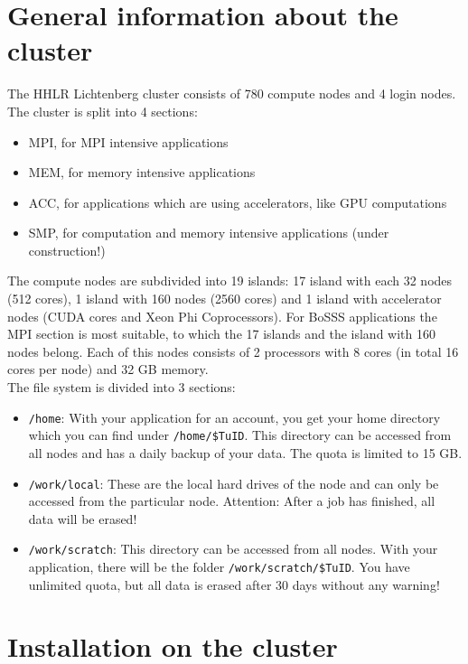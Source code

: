 \documentclass[11pt,twoside,a4paper]{fdyartcl}
\begin{document}
\section{General information about the cluster}
\label{sec:information}

The HHLR Lichtenberg cluster consists of 780 compute nodes and 4 login nodes. The cluster is split into 4 sections: 
\begin{itemize}
	\item MPI, for MPI intensive applications
	\item MEM, for memory intensive applications
	\item ACC, for applications which are using accelerators, like GPU computations
	\item SMP, for computation and memory intensive applications (under construction!)
\end{itemize}
The compute nodes are subdivided into 19 islands: 17 island with each 32 nodes (512 cores), 1 island with 160 nodes (2560 cores) and 1 island with accelerator nodes (CUDA cores and Xeon Phi Coprocessors). For BoSSS applications the MPI section is most suitable, to which the 17 islands and the island with 160 nodes belong. Each of this nodes consists of 2 processors with 8 cores (in total 16 cores per node) and 32 GB memory.\\
The file system is divided into 3 sections:
\begin{itemize}
\item \verb|/home|: With your application for an account, you get your home directory which you can find under \verb|/home/$TuID|. This directory can be accessed from all nodes and has a daily backup of your data. The quota is limited to 15 GB. 
\item \verb|/work/local|: These are the local hard drives of the node and can only be accessed from the particular node. Attention: After a job has finished, all data will be erased! 
\item \verb|/work/scratch|:  This directory can be accessed from all nodes. With your application, there will be the folder \verb|/work/scratch/$TuID|. You have unlimited quota, but all data is erased after 30 days without any warning! 
\end{itemize}


\section{Installation on the cluster}
\end{document}
